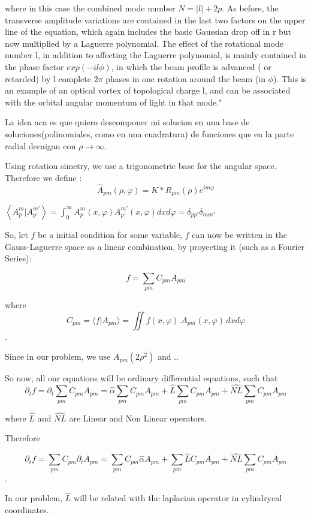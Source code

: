 	where in this case the combined mode number $N = |l| + 2p$. As before, the transverse amplitude variations are contained in the last two factors on the upper line of the equation, which again includes the basic Gaussian drop off in r but now multiplied by a Laguerre polynomial. The effect of the rotational mode number l, in addition to affecting the Laguerre polynomial, is mainly contained in the phase factor $exp(-il\phi)$, in which the beam profile is advanced ( or retarded) by l complete $2\pi $ phases in one rotation around the beam (in $\phi$). This is an example of an optical vortex of topological charge l, and can be associated with the orbital angular momentum of light in that mode."
	
	
	La idea aca es que quiero descomponer mi solucion en una base de soluciones(polinomiales, como en una cuadratura) de funciones que en la parte radial decaigan con $\rho \longrightarrow \infty$.
	

	
	Using rotation simetry, we use a trigonometric base for the angular space. Therefore we define : 
	\[\hat{A}_{pm}(\rho,\varphi)=K*R_{pm}(\rho)e^{im\varphi}\]
	
	
	$\left \langle A_p^m | A_{p'}^{m'} \right \rangle = \int_0^\infty A_p^m(x,\varphi) A_{p'}^{m'}(x,\varphi) dx d\varphi = \delta_{pp'}\delta_{mm'}$
	
	So, let $f$ be a initial condition for some variable,  $f$ can now be written in the Gauss-Laguerre space as a linear combination, by proyecting it (such as a Fourier Series):
	
	\[f=\sum_{pm}C_{pm}A_{pm}\]
	
	where \[C_{pm}=\langle f | A_{pm}\rangle=\iint f(x,\varphi).A_{pm}(x,\varphi) \, d\!x d\!\varphi  \].
	
	Since in our problem, we use $A_{pm}(2\rho^2)$ and ..
	
	So now, all our equations will be ordinary differential equations, such that 
	\[\partial_t f= \partial_t \sum_{pm}C_{pm}A_{pm}= \hat{\alpha} \sum_{pm}C_{pm}A_{pm} +\hat{L}\sum_{pm}C_{pm}A_{pm} + \hat{NL}\sum_{pm}C_{pm}A_{pm}    \]
	
	where $\hat{L}$ and $\hat{NL} $ are Linear and Non Linear operators.
	
	Therefore 
	
	\[\partial_t f= \sum_{pm}C_{pm} \partial_t A_{pm}= \sum_{pm}C_{pm} \hat{\alpha} A_{pm} +\sum_{pm} \hat{L}C_{pm}A_{pm} + \hat{NL}\sum_{pm}C_{pm}A_{pm} \].
	
	In our problem, $\hat{L}$ will be related with the laplacian operator in cylindrycal coordinates.
	
